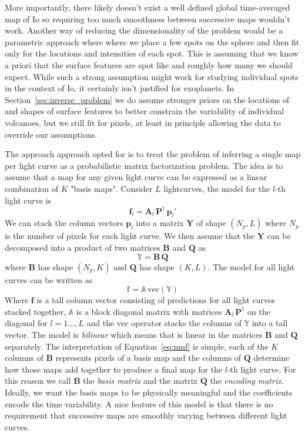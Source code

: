 \documentclass[modern]{aastex62}
\begin{document}
More importantly, there likely doesn't exist a well defined global time-averaged map of Io so requiring too much smoothness between successive maps wouldn't work.
Another way of reducing the dimensionality of the problem would be a parametric approach where where we place a few spots on the sphere and then fit only for the locations and intensities of each spot.
This is assuming that we know a priori that the surface features are spot like and roughly how many we should expect.
While such a strong assumption might work for studying individual spots in the context of Io, it certainly isn't justified for exoplanets.
In Section~\ref{sec:inverse_problem} we do assume stronger priors on the locations of and shapes of surface features to better constrain the variability of individual volcanoes, but we still fit for pixels, at least in principle allowing the data to override our assumptions.

The approach approach opted for is to treat the problem of inferring a single map per light curve as a probabilistic matrix factorization problem.
The idea is to assume that a map for any given light curve can be expressed as a linear combination of $K$ "basis maps".
Consider $L$ lightcurves, the model for the $l$-th light curve is
\begin{equation}
    \mathbf{f}_l=\mathbf{A}_l\,\mathbf{P}^\dagger\,\mathbf{p}_l'
\end{equation}
We can stack the column vectors $\mathbf{p}_l$ into a matrix $\mathbf{Y}$ of shape $(N_p, L)$ where $N_p$ is the number of pixels for each light curve.
We then assume that the $\mathbf{Y}$ can be decomposed into a product of two matrices $\mathbf{B}$ and $\mathbf{Q}$ as
\begin{equation}
    \mathbb{Y}=\mathbf{B}\,\mathbf{Q}
    \label{eq:nmf}
\end{equation}
where $\mathbf{B}$ has shape $(N_p, K)$ and $\mathbf{Q}$ has shape $(K, L)$.
The model for all light curves can be written as
\begin{equation}
    \mathbb{f}=\mathbb{A}\,\mathrm{vec}(\mathbf{\mathbb{Y}})
    \label{eq:model_all_lcs}
\end{equation}
Where $\mathbf{f}$ is a tall column vector consisting of predictions for all light curves stacked together, $\mathbb{A}$ is a block diagonal matrix with matrices $\mathbf{A}_l\,\mathbf{P}^\dagger$ on the diagonal for $l=1\dots, L$ and the $\mathrm{vec}$ operator stacks the columns of $\mathbb{Y}$ into a tall vector.
The model is \emph{bilinear} which means that is linear in the matrices $\mathbf{B}$ and $\mathbf{Q}$ separately.
The interpretation of Equation~\ref{eq:nmf} is simple, each of the $K$ columns of $\mathbf{B}$ represents pixels of a basis map and the columns of $\mathbf{Q}$ determine how those maps add together to produce a final map for the $l$-th light curve.
For this reason we call $\mathbf{B}$ the \emph{basis matrix} and the matrix $\mathbf{Q}$ the \emph{encoding matrix}.
Ideally, we want the basis maps to be physically meaningful and the coefficients encode the time variability.
A nice feature of this model is that there is no requirement that successive maps are smoothly varying between different light curves.
\end{document}
